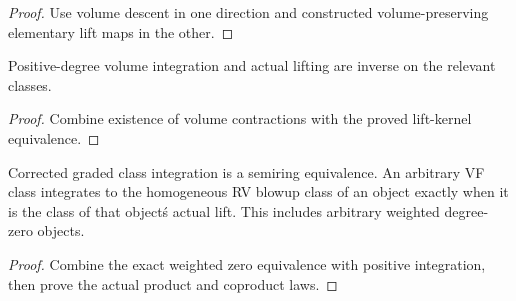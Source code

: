 \begin{proof}


\leanok

Use volume descent in one direction and constructed volume-preserving elementary lift maps in the other.

\end{proof}

\begin{proposition}

\label{s7-9}


\leanok

Positive-degree volume integration and actual lifting are inverse on the relevant classes.

\end{proposition}

\begin{proof}


\leanok

Combine existence of volume contractions with the proved lift-kernel equivalence.

\end{proof}

\begin{theorem}

\label{s7-10}


\leanok

Corrected graded class integration is a semiring equivalence. An arbitrary VF class integrates to the homogeneous RV blowup class of an object exactly when it is the class of that object\'s actual lift. This includes arbitrary weighted degree-zero objects.

\end{theorem}

\begin{proof}


\leanok

Combine the exact weighted zero equivalence with positive integration, then prove the actual product and coproduct laws.

\end{proof}

